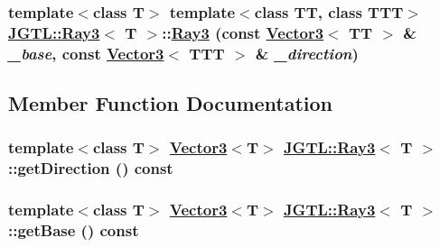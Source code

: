 \hypertarget{class_j_g_t_l_1_1_ray3_1a31f0cc4568493c7de6c9c6571f63c5}{
\subsubsection[Ray3]{\setlength{\rightskip}{0pt plus 5cm}template$<$class T$>$ template$<$class TT, class TTT$>$ \hyperlink{class_j_g_t_l_1_1_ray3}{JGTL::Ray3}$<$ T $>$::\hyperlink{class_j_g_t_l_1_1_ray3}{Ray3} (const \hyperlink{class_j_g_t_l_1_1_vector3}{Vector3}$<$ TT $>$ \& {\em \_\-base}, const \hyperlink{class_j_g_t_l_1_1_vector3}{Vector3}$<$ TTT $>$ \& {\em \_\-direction})}}
\label{class_j_g_t_l_1_1_ray3_1a31f0cc4568493c7de6c9c6571f63c5}




\subsection{Member Function Documentation}
\hypertarget{class_j_g_t_l_1_1_ray3_67bf186dce63bb65f0b5ad105e0d2418}{
\subsubsection[getDirection]{\setlength{\rightskip}{0pt plus 5cm}template$<$class T$>$ \hyperlink{class_j_g_t_l_1_1_vector3}{Vector3}$<$T$>$ \hyperlink{class_j_g_t_l_1_1_ray3}{JGTL::Ray3}$<$ T $>$::get\-Direction () const}}
\label{class_j_g_t_l_1_1_ray3_67bf186dce63bb65f0b5ad105e0d2418}


\hypertarget{class_j_g_t_l_1_1_ray3_2889303af0d3c3aaf7b24b4fb841613c}{
\subsubsection[getBase]{\setlength{\rightskip}{0pt plus 5cm}template$<$class T$>$ \hyperlink{class_j_g_t_l_1_1_vector3}{Vector3}$<$T$>$ \hyperlink{class_j_g_t_l_1_1_ray3}{JGTL::Ray3}$<$ T $>$::get\-Base () const}}
\label{class_j_g_t_l_1_1_ray3_2889303af0d3c3aaf7b24b4fb841613c}


